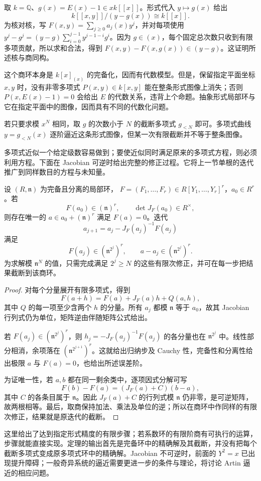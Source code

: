 \begin{example}\label{g5:exm:formal-graph-marked}
	取 \(k=\mathbb Q\)、\(g(x)=E(x)-1\in xk[[x]]\)。形式代入 \(y\mapsto g(x)\) 给出
	\[
		k[[x,y]]/(y-g(x))\cong k[[x]].
	\]
	为核对核，写 \(F(x,y)=\sum_{j\geq0}a_j(x)y^j\)，并对每项使用
	\(y^j-g^j=(y-g)\sum_{i=0}^{j-1}y^{j-1-i}g^i\)。因为 \(g\in(x)\)，每个固定总次数只收到有限多项贡献，所以求和合法，得到
	\(F(x,y)-F(x,g(x))\in(y-g)\)。这证明所述核与商同构。

	这个商环本身是 \(k[x]_{(x)}\) 的完备化，因而有代数模型。但是，保留指定平面坐标 \(x,y\) 时，没有非零多项式 \(P(x,y)\in k[x,y]\) 能在整条形式图像上消失；否则
	\(P(x,E(x)-1)=0\) 会给出 \(E\) 的代数关系，违背上个命题。抽象形式局部环与它在指定平面中的图像，因而具有不同的代数化问题。

	若只要求模 \(x^N\) 相同，取 \(g\) 的次数小于 \(N\) 的截断多项式 \(g_{<N}\) 即可。多项式曲线 \(y=g_{<N}(x)\) 逐阶逼近这条形式图像，但某一次有限截断并不等于整条图像。
\end{example}

多项式近似一个给定级数容易做到；要使近似同时满足原来的多项式方程，则必须利用方程。下面在 Jacobian 可逆时给出完整的修正过程。它将上一节单根的迭代推广到同样数目的方程与未知量。

\begin{theorem}\label{g5:thm:formal-newton-system}
	设 \((R,\mathfrak n)\) 为完备且分离的局部环，
	\(F=(F_1,\ldots,F_r)\in R[Y_1,\ldots,Y_r]^r\)，\(a_0\in R^r\)。若
	\[
		F(a_0)\in(\mathfrak n)^r,\qquad
		\det J_F(a_0)\in R^\times,
	\]
	则存在唯一的 \(a\in a_0+(\mathfrak n)^r\) 满足 \(F(a)=0\)。迭代
	\[
		a_{j+1}=a_j-J_F(a_j)^{-1}F(a_j)
	\]
	满足
	\[
		F(a_j)\in(\mathfrak n^{2^j})^r,\qquad
		a-a_j\in(\mathfrak n^{2^j})^r.
	\]
	为求解模 \(\mathfrak n^N\) 的值，只需完成满足 \(2^j\geq N\) 的这些有限次修正，并可在每一步把结果截断到该商环。
\end{theorem}
\begin{proof}
	对每个分量展开有限多项式，得到
	\[
		F(a+h)=F(a)+J_F(a)h+Q(a,h),
	\]
	其中 \(Q\) 的每一项至少含两个 \(h\) 的分量。所有 \(a_j\) 都模 \(\mathfrak n\) 等于 \(a_0\)，故其 Jacobian 行列式仍为单位，矩阵逆由伴随矩阵公式给出。

	若 \(F(a_j)\in(\mathfrak n^{2^j})^r\)，则
	\(h_j=-J_F(a_j)^{-1}F(a_j)\) 的各分量也在 \(\mathfrak n^{2^j}\) 中。线性部分相消，余项落在 \((\mathfrak n^{2^{j+1}})^r\)。这就给出归纳步及 Cauchy 性，完备性和分离性给出极限 \(a\) 与 \(F(a)=0\)，也给出所述误差阶。

	为证唯一性，若 \(a,b\) 都在同一剩余类中，逐项因式分解可写
	\[
		F(b)-F(a)=(J_F(a)+C)(b-a),
	\]
	其中 \(C\) 的各条目属于 \(\mathfrak n\)。因此 \(J_F(a)+C\) 的行列式模 \(\mathfrak n\) 仍非零，是可逆矩阵，故两根相等。最后，取商保持加法、乘法及单位的逆；所以在商环中作同样的有限次修正，结果就是原迭代的截断。
\end{proof}

这里给出了达到指定形式精度的有限步骤；若系数环的有限阶商有可执行的运算，步骤就能直接实现。定理的输出首先是完备环中的精确解及其截断，并没有把每个截断多项式变成原多项式环中的精确解。Jacobian 不可逆时，前面的 \(Y^2=x\) 已出现提升障碍；一般奇异系统的逼近需要更进一步的条件与理论，将讨论 Artin 逼近的相应问题。
